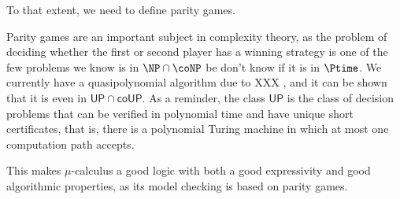 



To that extent, we need to define parity games.

Parity games are an important subject in complexity theory,
as the problem of deciding whether the first or second player
has a winning strategy is one of the few problems we know is
in $\NP \cap \coNP$ be don't know if it is in $\Ptime$.
We currently have a quasipolynomial algorithm due to XXX ,
and it can be shown that it is even in $\mathsf{UP} \cap \mathsf{coUP}$.
As a reminder, the class $\mathsf{UP}$ is the class of decision problems
that can be verified in polynomial time and have unique short certificates,
that is, there is a polynomial Turing machine in which at most one computation path accepts.

This makes $\mu$-calculus a good logic with both a good expressivity and
good algorithmic properties, as its model checking is based on parity games.

